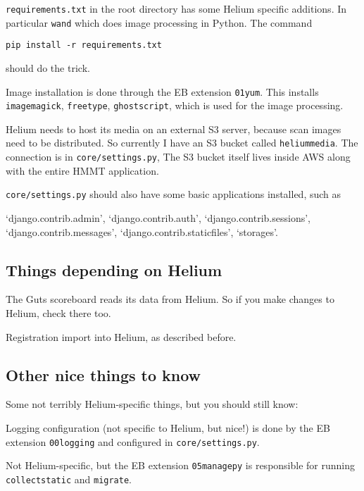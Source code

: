 \begin{itemize}
	\ii \texttt{requirements.txt} in the root directory
	has some Helium specific additions.
	In particular \texttt{wand} which does image processing in Python.
	The command
	\begin{center}
		\texttt{pip install -r requirements.txt}
	\end{center}
	should do the trick.

	\ii Image installation is done through the EB extension \texttt{01yum}.
	This installs \texttt{imagemagick}, \texttt{freetype}, \texttt{ghostscript},
	which is used for the image processing.

	\ii Helium needs to host its media on an external S3 server,
	because scan images need to be distributed.
	So currently I have an S3 bucket called \texttt{heliummedia}.
	The connection is in \texttt{core/settings.py},
	The S3 bucket itself lives inside AWS along with the entire HMMT application.
	
	\ii \texttt{core/settings.py} should also have some basic applications
	installed, such as
	\begin{itemize}
		\ii `django.contrib.admin',
		\ii `django.contrib.auth',
		\ii `django.contrib.sessions',
		\ii `django.contrib.messages',
		\ii `django.contrib.staticfiles',
		\ii `storages'.
	\end{itemize}
\end{itemize}

\subsection{Things depending on Helium}
\begin{itemize}
	\ii The Guts scoreboard reads its data from Helium.
	So if you make changes to Helium, check there too.
	
	\ii Registration import into Helium, as described before.
\end{itemize}

\subsection{Other nice things to know}
Some not terribly Helium-specific things, but you should still know:
\begin{itemize}
	\ii Logging configuration (not specific to Helium, but nice!)
	is done by the EB extension \texttt{00logging}
	and configured in \texttt{core/settings.py}.
	
	\ii Not Helium-specific, but the EB extension \texttt{05managepy}
	is responsible for running \texttt{collectstatic} and \texttt{migrate}.
\end{itemize}

